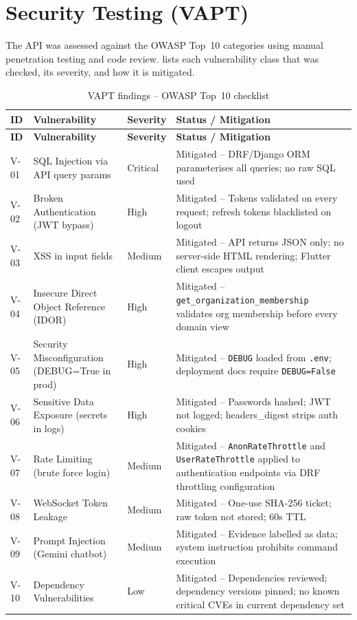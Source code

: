 \section{Security Testing (VAPT)}

The API was assessed against the OWASP Top~10 categories using manual
penetration testing and code review.   lists each
vulnerability class that was checked, its severity, and how it is mitigated.

\begin{longtable}{@{}>{\raggedright\arraybackslash}p{1.0cm}
                    >{\raggedright\arraybackslash}p{4.0cm}
                    >{\raggedright\arraybackslash}p{1.8cm}
                    >{\raggedright\arraybackslash}p{7.6cm}@{}}
\caption{VAPT findings -- OWASP Top~10 checklist \cite{owasp2021}}\label{tab:vapt}\\
\toprule
\textbf{ID} & \textbf{Vulnerability} & \textbf{Severity} & \textbf{Status / Mitigation}\\
\midrule
\endfirsthead
\toprule
\textbf{ID} & \textbf{Vulnerability} & \textbf{Severity} & \textbf{Status / Mitigation}\\
\midrule
\endhead
\bottomrule
\endlastfoot
V-01 & SQL Injection via API query params &
  Critical & Mitigated -- DRF/Django ORM parameterises all queries; no raw SQL used\\
V-02 & Broken Authentication (JWT bypass) &
  High & Mitigated -- Tokens validated on every request; refresh tokens blacklisted on logout\\
V-03 & XSS in input fields &
  Medium & Mitigated -- API returns JSON only; no server-side HTML rendering; Flutter client escapes output\\
V-04 & Insecure Direct Object Reference (IDOR) &
  High & Mitigated -- \texttt{get\_organization\_membership} validates org membership before every domain view\\
V-05 & Security Misconfiguration (DEBUG=True in prod) &
  High & Mitigated -- \texttt{DEBUG} loaded from \texttt{.env}; deployment docs require \texttt{DEBUG=False}\\
V-06 & Sensitive Data Exposure (secrets in logs) &
  High & Mitigated -- Passwords hashed; JWT not logged; headers\_digest strips auth cookies\\
V-07 & Rate Limiting (brute force login) &
  Medium & Mitigated -- \texttt{AnonRateThrottle} and \texttt{UserRateThrottle} applied to authentication endpoints via DRF throttling configuration\\
V-08 & WebSocket Token Leakage &
  Medium & Mitigated -- One-use SHA-256 ticket; raw token not stored; 60s TTL\\
V-09 & Prompt Injection (Gemini chatbot) &
  Medium & Mitigated -- Evidence labelled as data; system instruction prohibits command execution\\
V-10 & Dependency Vulnerabilities &
  Low & Mitigated -- Dependencies reviewed; dependency versions pinned; no known critical CVEs in current dependency set\\
\end{longtable}


